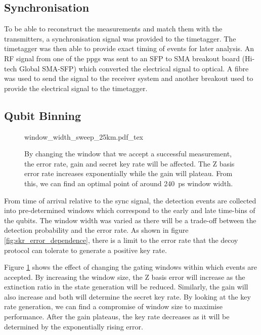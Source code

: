 
\subsection{Synchronisation}

To be able to reconstruct the measurements and match them with the transmitters, a synchronisation signal was provided to the timetagger. The timetagger was then able to provide exact timing of events for later analysis. An RF signal from one of the \acp{ppg} was sent to an SFP to SMA breakout board (Hi-tech Global SMA-SFP) which converted the electrical signal to optical. A fibre was used to send the signal to the receiver system and another breakout used to provide the electrical signal to the timetagger. 

\subsection{Qubit Binning}

\begin{figure}[t]
	\centering
	\tiny
	\def\svgwidth{\textwidth} 
	{window_width_sweep_25km.pdf_tex}
	\caption[Error, gain and key rate dependence on bin width]{By changing the window that we accept a successful measurement, the error rate, gain and secret key rate will be affected. The Z basis error rate increases exponentially while the gain will plateau. From this, we can find an optimal point of around \SI{240}{\ps} window width.}
	\label{fig:window_sweep}
\end{figure}

From time of arrival relative to the sync signal, the detection events are collected into pre-determined windows which correspond to the early and late time-bins of the qubits. The window width was varied as there will be a trade-off between the detection probability and the error rate. As shown in figure \ref{fig:skr_error_dependence}, there is a limit to the error rate that the decoy protocol can tolerate to generate a positive key rate.

Figure \ref{fig:window_sweep} shows the effect of changing the gating windows within which events are accepted. By increasing the window size, the Z basis error will increase as the extinction ratio in the state generation will be reduced. Similarly, the gain will also increase and both will determine the secret key rate. By looking at the key rate generation, we can find a compromise of window size to maximise performance. After the gain plateaus, the key rate decreases as it will be determined by the exponentially rising error.

